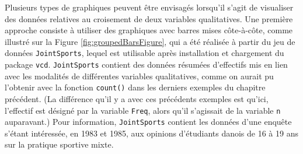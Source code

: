 \documentclass[
  french,
]{book}
\begin{document}
Plusieurs types de graphiques peuvent être envisagés lorsqu'il s'agit de visualiser des données relatives au croisement de deux variables qualitatives. Une première approche consiste à utiliser des graphiques avec barres mises côte-à-côte, comme illustré sur la Figure \ref{fig:groupedBarsFigure}, qui a été réalisée à partir du jeu de données \texttt{JointSports}, lequel est utilisable après installation et chargement du package \texttt{vcd}. \texttt{JointSports} contient des données résumées d'effectifs mis en lien avec les modalités de différentes variables qualitatives, comme on aurait pu l'obtenir avec la fonction \texttt{count()} dans les derniers exemples du chapitre précédent. (La différence qu'il y a avec ces précédents exemples est qu'ici, l'effectif est désigné par la variable \texttt{Freq}, alors qu'il s'agissait de la variable \texttt{n} auparavant.) Pour information, \texttt{JointSports} contient les données d'une enquête s'étant intéressée, en 1983 et 1985, aux opinions d'étudiants danois de 16 à 19 ans sur la pratique sportive mixte.
\end{document}
